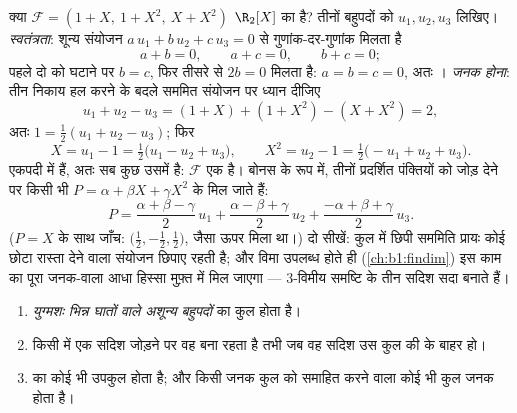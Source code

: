\begin{example}[संभावित आधार की जाँच, आदि से अंत तक]
\label{ex:b1:vspaces:testbasis}
क्या $\mathcal{F} = (1 + X,\ 1 + X^2,\ X + X^2)$ $\R_2[X]$ का  है? तीनों
बहुपदों को $u_1, u_2, u_3$ लिखिए। \emph{स्वतंत्रता}: शून्य संयोजन $a\,u_1 +
b\,u_2 + c\,u_3 = 0$ से गुणांक-दर-गुणांक मिलता है
\[
a + b = 0, \qquad a + c = 0, \qquad b + c = 0 ;
\]
पहले दो को घटाने पर $b = c$, फिर तीसरे से $2b = 0$ मिलता है: $a = b = c =
0$, अतः । \emph{जनक होना}: तीन निकाय हल करने के बदले सममित संयोजन पर
ध्यान दीजिए
\[
u_1 + u_2 - u_3 = (1 + X) + (1 + X^2) - (X + X^2) = 2 ,
\]
अतः $1 = \frac12(u_1 + u_2 - u_3)$; फिर
\[
X = u_1 - 1 = \tfrac12\bigl(u_1 - u_2 + u_3\bigr),
\qquad
X^2 = u_2 - 1 = \tfrac12\bigl(-u_1 + u_2 + u_3\bigr).
\]
एकपदी  में हैं, अतः सब कुछ उसमें है: $\mathcal{F}$ एक  है।
बोनस के रूप में, तीनों प्रदर्शित पंक्तियों को जोड़ देने पर किसी भी $P =
\alpha + \beta X + \gamma X^2$ के  मिल जाते हैं:
\[
P = \frac{\alpha + \beta - \gamma}{2}\,u_1
+ \frac{\alpha - \beta + \gamma}{2}\,u_2
+ \frac{-\alpha + \beta + \gamma}{2}\,u_3 .
\]
($P = X$ के साथ जाँच:  $\bigl(\frac12, -\frac12, \frac12\bigr)$,
जैसा ऊपर मिला था।) दो सीखें: कुल में छिपी सममिति प्रायः कोई छोटा रास्ता देने
वाला संयोजन छिपाए रहती है; और विमा उपलब्ध होते ही (\cref{ch:b1:findim}) इस
काम का पूरा जनक-वाला आधा हिस्सा मुफ़्त में मिल जाएगा --- $3$-विमीय समष्टि के
तीन  सदिश सदा  बनाते हैं।
\end{example}

\begin{proposition}[स्वतंत्रता की उपयोगी कसौटियाँ]\label{prop:b1:vspaces:freecriteria}
\begin{enumerate}
  \item \emph{युग्मशः भिन्न घातों वाले अशून्य बहुपदों} का कुल  होता
  है।
  \item किसी  में एक सदिश जोड़ने पर वह  बना रहता है तभी
  जब वह सदिश उस कुल की  के बाहर हो।
  \item {} का कोई भी उपकुल  होता है; और किसी जनक कुल को
  समाहित करने वाला कोई भी कुल जनक होता है।
\end{enumerate}
\end{proposition}

